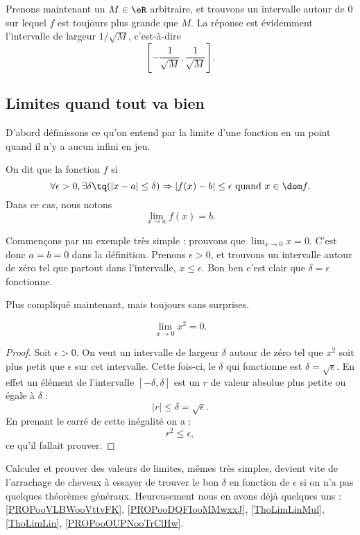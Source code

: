 Prenons maintenant un $M\in\eR$ arbitraire, et trouvons un intervalle autour de $0$ sur lequel $f$ est toujours plus grande que $M$. La réponse est évidemment l'intervalle de largeur $1/\sqrt{M}$, c'est-à-dire
\[
  \left[ -\frac{ 1 }{ \sqrt{M} },\frac{ 1 }{ \sqrt{M} } \right].
\]

\subsection{Limites quand tout va bien}

D'abord définissons ce qu'on entend par la limite d'une fonction en un point quand il n'y a aucun infini en jeu.
\begin{definition}      \label{DefLimPointSansInfini}
 On dit que la fonction $f$  si
\[
  \forall \epsilon>0,\exists\delta\tq (| x-a |\leq\delta)\Rightarrow | f(x)-b |\leq \epsilon\text{ quand }x\in\dom f.
\]
Dans ce cas, nous notons
\begin{equation}
\lim_{x\to a}f(x)=b.
\end{equation}
\end{definition}

Commençons par un exemple très simple : prouvons que $\lim_{x\to 0}x=0$. C'est donc $a=b=0$ dans la définition. Prenons $\epsilon>0$, et trouvons un intervalle autour de zéro tel que partout dans l'intervalle, $x\leq \epsilon$. Bon ben c'est clair que $\delta=\epsilon$ fonctionne.

Plus compliqué maintenant, mais toujours sans surprises.

\begin{proposition}
\[
  \lim_{x\to 0}x^2=0.
\]

\end{proposition}

\begin{proof}
Soit $\epsilon>0$. On veut un intervalle de largeur $\delta$ autour de zéro tel que $x^2$ soit plus petit que $\epsilon$ sur cet intervalle. Cette fois-ci, le $\delta$ qui fonctionne est $\delta=\sqrt{\epsilon}$. En effet un élément de l'intervalle $[-\delta,\delta]$ est un $r$ de valeur absolue plus petite ou égale à $\delta$ :
\[
| r |\leq\delta=\sqrt{\epsilon}.
\]
En prenant le carré de cette inégalité on a :
\[
  r^2\leq\epsilon,
\]
ce qu'il fallait prouver.
\end{proof}

Calculer et prouver des valeurs de limites, mêmes très simples, devient vite de l'arrachage de cheveux à essayer de trouver le bon $\delta$ en fonction de $\epsilon$ si on n'a pas quelques théorèmes généraux. Heureusement nous en avons déjà quelques uns : \ref{PROPooVLBWooVttvFK}, \ref{PROPooDQFIooMMwxxJ}, \ref{ThoLimLinMul}, \ref{ThoLimLin}, \ref{PROPooOUPNooTrClHw}.

